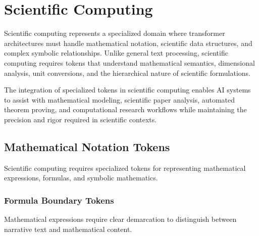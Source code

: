 
\section{Scientific Computing}

Scientific computing represents a specialized domain where transformer architectures must handle mathematical notation, scientific data structures, and complex symbolic relationships. Unlike general text processing, scientific computing requires tokens that understand mathematical semantics, dimensional analysis, unit conversions, and the hierarchical nature of scientific formulations.
\begin{comment}
Feedback: This is a good start. To highlight the unique challenge, you could add: "Processing scientific text is not merely a matter of adding new vocabulary. It requires understanding a fundamentally different and more structured 'language' embedded within natural language—the language of mathematics and formal science, where symbols have precise, context-dependent meanings and relationships are governed by strict logical rules."
\end{comment}

The integration of specialized tokens in scientific computing enables AI systems to assist with mathematical modeling, scientific paper analysis, automated theorem proving, and computational research workflows while maintaining the precision and rigor required in scientific contexts.

\subsection{Mathematical Notation Tokens}

Scientific computing requires specialized tokens for representing mathematical expressions, formulas, and symbolic mathematics.

\subsubsection{Formula Boundary Tokens}

Mathematical expressions require clear demarcation to distinguish between narrative text and mathematical content.
\begin{comment}
Feedback: Before linking to the code, it's helpful to explain the motivation. For example: "A standard tokenizer would break a formula like `E=mc^2` into disconnected tokens (`e`, `=`, `m`, `c`, `^`, `2`), losing the critical semantic structure. By wrapping formulas in special tokens like `<MATH_START>` and `<MATH_END>`, the model learns to treat the content within as a distinct semantic unit, allowing it to apply a different 'mode' of processing that respects mathematical syntax."
\end{comment}

